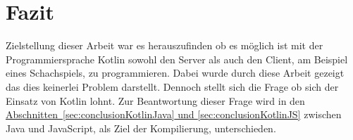
\chapter{Fazit}
Zielstellung dieser Arbeit war es herauszufinden ob es möglich ist mit der Programmiersprache Kotlin sowohl den Server als auch den Client, am Beispiel eines Schachspiels, zu programmieren. Dabei wurde durch diese Arbeit gezeigt das dies keinerlei Problem darstellt. Dennoch stellt sich die Frage ob sich der Einsatz von Kotlin lohnt. Zur Beantwortung dieser Frage wird in den \hyperref[sec:conclusionKotlinJava, sec:conclusionKotlinJS]{Abschnitten~\ref{sec:conclusionKotlinJava} und \ref{sec:conclusionKotlinJS}} zwischen Java und JavaScript, als Ziel der Kompilierung, unterschieden.

